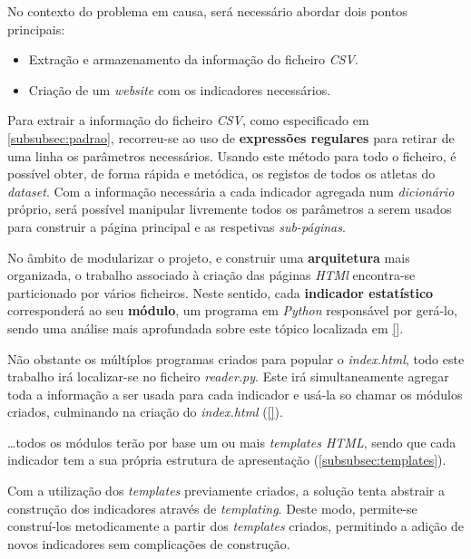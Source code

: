No contexto do problema em causa, será necessário abordar dois pontos principais:
\begin{itemize}
    \item Extração e armazenamento da informação do ficheiro \textit{CSV}.
    \item Criação de um \textit{website} com os indicadores necessários.
\end{itemize}

Para extrair a informação do ficheiro \textit{CSV}, como especificado em \ref{subsubsec:padrao}, recorreu-se ao uso de \textbf{expressões regulares} para retirar
de uma linha os parâmetros necessários.
Usando este método para todo o ficheiro, é possível obter, de forma rápida e metódica, os registos de todos os atletas 
do \textit{dataset}.
Com a informação necessária a cada indicador agregada num \textit{dicionário} próprio, será possível manipular 
livremente todos os parâmetros a serem usados para construir a página principal e as respetivas \textit{sub-páginas}.

No âmbito de modularizar o projeto, e construir uma \textbf{arquitetura} mais organizada, o trabalho associado à criação das páginas \textit{HTMl} encontra-se 
particionado por vários ficheiros. 
Neste sentido, cada \textbf{indicador estatístico} corresponderá ao seu \textbf{módulo}, um programa em \textit{Python} responsável por gerá-lo, sendo uma análise mais aprofundada
sobre este tópico localizada em \ref{}.

Não obstante os múltíplos programas criados para popular o \textit{index.html}, todo este trabalho irá localizar-se no ficheiro \textit{reader.py}. 
Este irá simultaneamente agregar toda a informação a ser usada para cada indicador e usá-la so chamar os módulos criados, culminando na criação do 
\textit{index.html} (\ref{}). 

\dots todos os módulos terão por base um ou mais \textit{templates HTML}, sendo que cada indicador tem a sua própria estrutura de apresentação (\ref{subsubsec:templates}).

Com a utilização dos \textit{templates} previamente criados, a solução tenta abstrair a construção dos indicadores através de \textit{templating}.
Deste modo, permite-se construí-los metodicamente a partir dos \textit{templates} criados, permitindo a adição de novos indicadores sem complicações de construção.